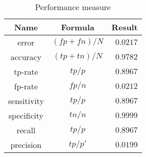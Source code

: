 \begin{table}
    \centering
    \begin{tabular}{|c|c|r|}\hline
    Name        & Formula       &   Result      \\\hline
    error       & $(fp+fn)/N$   &   $0.0217$    \\
    accuracy    & $(tp+tn)/N$   &   $0.9782$    \\\hline
    tp-rate     & $tp/p$        &   $0.8967$    \\
    fp-rate     & $fp/n$        &   $0.0212$    \\\hline
    sensitivity & $tp/p$        &   $0.8967$    \\
    specificity & $tn/n$        &   $0.9999$    \\\hline
    recall      & $tp/p$        &   $0.8967$    \\
    precision   & $tp/p'$       &   $0.0199$    \\\hline
    \end{tabular}
    \caption{Performance measure}
    \label{tab:performance}
\end{table}